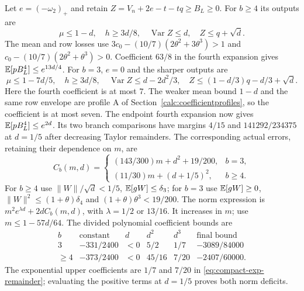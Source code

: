 Let $e=( -\omega_2)_+$ and retain
$Z=V_n+2e-t-tq\ge B_L\ge0$.
For $b\ge4$ its outputs are
\[
 \mu\le1-d,\quad h\ge3d/8,\quad\operatorname{Var}Z\le d,\quad
 Z\le q+\sqrt d.
\]
The mean and row losses use
$3c_0-(10/7)(2\theta^2+3\theta^3)>1$ and
$c_0-(10/7)(2\theta^2+\theta^3)>0$.
Coefficient $63/8$ in the fourth expansion gives
$\mathbb E[pB_L^4]\le e^{13d/4}$.
For $b=3$, $e=0$ and the sharper outputs are
\[
 \mu\le1-7d/5,\quad h\ge3d/8,\quad
 \operatorname{Var}Z\le d-2d^2/3,\quad
 Z\le(1-d/3)q-d/3+\sqrt d.
\]
Here the fourth coefficient is at most $7$.
The weaker mean bound $1-d$ and the same row envelope are
profile A of Section~\ref{calc:coefficientprofiles}, so the coefficient
is at most seven.
The endpoint fourth expansion now gives $\mathbb E[pB_L^4]\le e^{2d}$.
Its two branch comparisons have margins $4/15$ and $141292/234375$ at
$d=1/5$ after decreasing Taylor remainders.
The corresponding actual errors, retaining their dependence on $m$, are
\[
 C_b(m,d)=\begin{cases}
 (143/300)m+d^2+19/200,&b=3,\\
 (11/30)m+(d+1/5)^2,&b\ge4.
 \end{cases}
\]
For $b\ge4$ use $\|W\|/\sqrt d<1/5$, $\mathbb E[gW]\le \delta_{3}$;
for $b=3$ use $\mathbb E[gW]\ge0$,
$\|W\|^2\le(1+\theta)\delta_{4}$ and $(1+\theta)\theta^3<19/200$.
The norm expression is
$m^2e^{\lambda d}+2dC_b(m,d)$, with
$\lambda=1/2$ or $13/16$. It increases in $m$; use $m\le1-57d/64$.
The divided polynomial coefficient bounds are
\[
 \begin{array}{c|rrrr|c}
 b&\text{constant}&d&d^2&d^3&\text{final bound}\\\hline
 3&-331/2400&<0&5/2&1/7&-3089/84000\\
 \ge4&-373/2400&<0&45/16&7/20&-2407/60000.
 \end{array}
\]
The exponential upper coefficients are $1/7$ and $7/20$ in
\eqref{eq:compact-exp-remainder}; evaluating the positive terms at $d=1/5$
proves both norm deficits.

